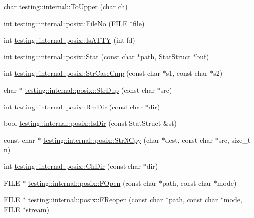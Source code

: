 \begin{DoxyCompactItemize}
\item 
char \hyperlink{namespacetesting_1_1internal_ac1b876a8133895bd553d4780ecaa1e3a}{testing\+::internal\+::\+To\+Upper} (char ch)
\item 
int \hyperlink{namespacetesting_1_1internal_1_1posix_a3117b067e1f942a2031e666953120ccc}{testing\+::internal\+::posix\+::\+File\+No} (F\+I\+L\+E $\ast$file)
\item 
int \hyperlink{namespacetesting_1_1internal_1_1posix_a16ebe936b3a8ea462a94191635aedc27}{testing\+::internal\+::posix\+::\+Is\+A\+T\+T\+Y} (int fd)
\item 
int \hyperlink{namespacetesting_1_1internal_1_1posix_a2b87b7ff647a128614daf50667eb9304}{testing\+::internal\+::posix\+::\+Stat} (const char $\ast$path, Stat\+Struct $\ast$buf)
\item 
int \hyperlink{namespacetesting_1_1internal_1_1posix_a1ef2385a7f8e4c706054da35967e76bd}{testing\+::internal\+::posix\+::\+Str\+Case\+Cmp} (const char $\ast$s1, const char $\ast$s2)
\item 
char $\ast$ \hyperlink{namespacetesting_1_1internal_1_1posix_a8e352884793a65ae8be144676f1a9136}{testing\+::internal\+::posix\+::\+Str\+Dup} (const char $\ast$src)
\item 
int \hyperlink{namespacetesting_1_1internal_1_1posix_acbad5d4ea5b73fd1765f5f760642932a}{testing\+::internal\+::posix\+::\+Rm\+Dir} (const char $\ast$dir)
\item 
bool \hyperlink{namespacetesting_1_1internal_1_1posix_af0d04ed5baeed28353fa38742748a421}{testing\+::internal\+::posix\+::\+Is\+Dir} (const Stat\+Struct \&st)
\item 
const char $\ast$ \hyperlink{namespacetesting_1_1internal_1_1posix_a36fca815713332e5c6dc92c98b6b2574}{testing\+::internal\+::posix\+::\+Str\+N\+Cpy} (char $\ast$dest, const char $\ast$src, size\+\_\+t n)
\item 
int \hyperlink{namespacetesting_1_1internal_1_1posix_a1ddc8a4fc6bb21da372307485591a212}{testing\+::internal\+::posix\+::\+Ch\+Dir} (const char $\ast$dir)
\item 
F\+I\+L\+E $\ast$ \hyperlink{namespacetesting_1_1internal_1_1posix_a4042201dcc4932641d484e7ddf94de7d}{testing\+::internal\+::posix\+::\+F\+Open} (const char $\ast$path, const char $\ast$mode)
\item 
F\+I\+L\+E $\ast$ \hyperlink{namespacetesting_1_1internal_1_1posix_a9ef6d089cdae03f9d9e0e6d379c40703}{testing\+::internal\+::posix\+::\+F\+Reopen} (const char $\ast$path, const char $\ast$mode, F\+I\+L\+E $\ast$stream)
\item 

\end{DoxyCompactItemize}
